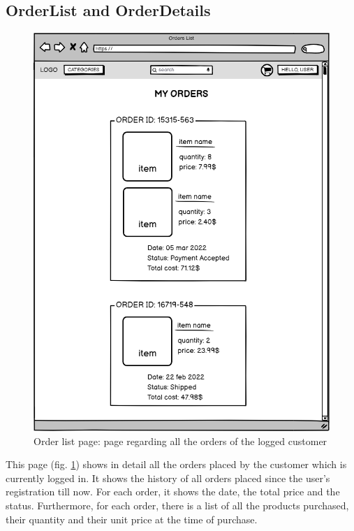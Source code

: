 \subsection{OrderList and OrderDetails}
    \begin{figure}[H]
        \centering
        \includegraphics[width=\textwidth,height=0.7\textheight,keepaspectratio]{mockups/ordersPageMockup.png}
            \caption{Order list page: page regarding all the orders of the logged customer}
            \label{fig:OrderPage}
    \end{figure}

This page (fig. \ref{fig:OrderPage}) shows  in detail all the orders placed by the customer which is currently logged in. It shows the history of all orders placed since the user's registration till now. For each order, it shows the date, the total price and the status.
Furthermore, for each order, there is a list of all the products purchased, their quantity and their unit price at the time of purchase.

